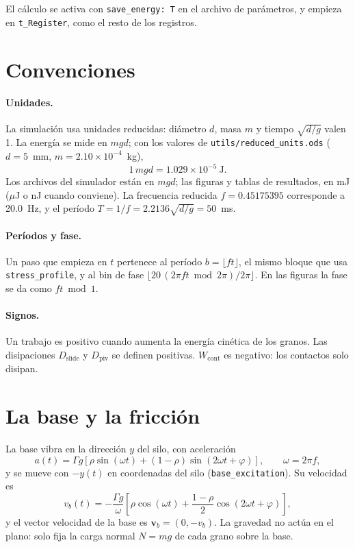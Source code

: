 \documentclass[11pt,a4paper]{article}
\newcommand{\vect}[1]{\mathbf{#1}}
\newcommand{\vv}{\vect{v}}
\newcommand{\code}[1]{\texttt{#1}}
\newcommand{\Wcont}{W_\text{cont}}
\newcommand{\Dslide}{D_\text{slide}}
\newcommand{\Dpiv}{D_\text{piv}}
\begin{document}
El cálculo se activa con \code{save\_energy:~T} en el archivo de
parámetros, y empieza en \code{t\_Register}, como el resto de los
registros.

\section{Convenciones}

\paragraph{Unidades.} La simulación usa unidades reducidas: diámetro $d$,
masa $m$ y tiempo $\sqrt{d/g}$ valen 1. La energía se mide en $mgd$; con
los valores de \code{utils/reduced\_units.ods} ($d = 5$~mm,
$m = 2.10 \times 10^{-4}$~kg),
\[
  1\,mgd = 1.029 \times 10^{-5}\ \text{J} .
\]
Los archivos del simulador están en $mgd$; las figuras y tablas de
resultados, en mJ ($\mu$J o nJ cuando conviene). La frecuencia reducida
$f = 0.45175395$ corresponde a 20.0~Hz, y el período
$T = 1/f = 2.2136\sqrt{d/g} = 50$~ms.

\paragraph{Períodos y fase.} Un paso que empieza en $t$ pertenece al
período $b = \lfloor f t \rfloor$, el mismo bloque que usa
\code{stress\_profile}, y al bin de fase $\lfloor 20\,(2\pi f t \bmod
2\pi)/2\pi \rfloor$. En las figuras la fase se da como $f t \bmod 1$.

\paragraph{Signos.} Un trabajo es positivo cuando aumenta la energía
cinética de los granos. Las disipaciones $\Dslide$ y $\Dpiv$ se definen
positivas. $\Wcont$ es negativo: los contactos solo disipan.

\section{La base y la fricción}
\label{sec:base}

La base vibra en la dirección $y$ del silo, con aceleración
\begin{equation}
  a(t) = \Gamma g \left[ \rho \sin(\omega t) + (1-\rho) \sin(2 \omega t +
  \varphi) \right], \qquad \omega = 2 \pi f ,
\end{equation}
y se mueve con $-y(t)$ en coordenadas del silo
(\code{base\_excitation}). Su velocidad es
\begin{equation}
  v_b(t) = -\frac{\Gamma g}{\omega} \left[ \rho \cos(\omega t) +
  \frac{1-\rho}{2} \cos(2 \omega t + \varphi) \right] ,
  \label{eq:vb}
\end{equation}
y el vector velocidad de la base es $\vv_b = (0, -v_b)$. La gravedad no
actúa en el plano: solo fija la carga normal $N = mg$ de cada grano sobre
la base.
\end{document}
